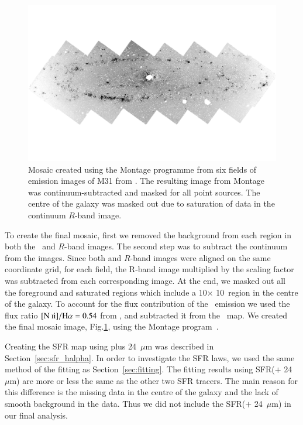 \begin{figure}
\centering
\includegraphics[width=164mm]{../image_paper1/halpha.pdf}
\caption[Mosaic of H$\alpha$ emission images of M31]{Mosaic created using the Montage programme from six fields of \halpha emission images of M31 from \citet{Massey07}. The resulting image from Montage was continuum-subtracted and masked for all point sources. The centre of the galaxy was masked out due to saturation of data in the continuum $R$-band image.}
\label{fig:halpha}
\end{figure}

To create the final mosaic, first we removed the background from each region in both the \halpha\ and $R$-band images. The second step was to subtract the continuum from the \halpha images. Since both \halpha and $R$-band images were aligned on the same coordinate grid, for each field, the R-band image multiplied by the scaling factor was subtracted from each corresponding \halpha image. At the end, we masked out all the foreground and saturated regions which include a 10\arcmin $\times$ 10\arcmin\ region in the centre of the galaxy. To account for the flux contribution of the \nii\ emission we used the flux ratio $\mathrm{[N~{\textsc ii}]}/\mathrm{H}\alpha = 0.54$ from \citet{Kennicutt08}, and subtracted it from the \halpha\ map. We created the final mosaic image, Fig.\ref{fig:halpha}, using the Montage program~\citep{Berriman08}.

Creating the SFR map using \halpha plus 24~$\mu$m was described in Section~\ref{sec:sfr_halpha}. In order to investigate the SFR laws, we used the same method of the fitting as Section~\ref{sec:fitting}. The fitting results using SFR(\halpha $+$ 24~$\mu$m) are more or less the same as the other two SFR tracers. The main reason for this difference is the missing data in the centre of the galaxy and the lack of smooth background in the \halpha data. Thus we did not include the SFR(\halpha $+$ 24~$\mu$m) in our final analysis.




